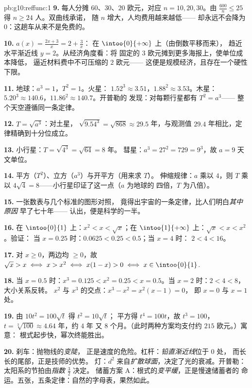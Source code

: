 \begin{solution}{pb:g10:reffunc:1}
\textbf{9.} 每人分摊 $60$、$30$、$20$ 欧元，对应 $n = 10, 20,
30$。由 $\frac{600}{n} \leq 25$ 得 $n \geq 24$ 人。双曲线承诺，
随 $n$ 增大，人均费用越来越低——
却永远不会降为 $0$：这趟车从来不是免费的。

\textbf{10.} $a(x) = \frac{2x + 3}{x} = 2 + \frac3x$：
在 $\intoo{0}{+\infty}$ 上（由倒数平移而来），
趋近水平渐近线 $y = 2$。从经济角度看：将
固定的 $3$ 欧元摊到更多海报上，使单位成本降低，
逼近材料费中不可压缩的 $2$ 欧元——
这便是规模经济，且存在一个硬性下限。

\textbf{11.} 地球：$a^3 = 1$，$T^2 = 1$。火星：
$1.52^3 \approx 3.51$，$1.88^2 \approx 3.53$。木星：
$5.20^3 \approx 140.6$，$11.86^2 \approx 140.7$。开普勒的
发现：对每颗行星都有 $T^2 = a^3$——
整个天空遵循同一条定律。

\textbf{12.} $T = \sqrt{a^3}$：对土星，
$\sqrt{9.54^3} = \sqrt{868} \approx 29.5$ 年，与观测值
$29.4$ 年相比，定律精确到十分位成立。

\textbf{13.} 小行星：$T = \sqrt{4^3} = \sqrt{64} = 8$ 年。
彗星：$a^3 = 27^2 = 729 = 9^3$，故 $a = 9$ 天文单位。

\textbf{14.} 平方（$T^2$）、立方（$a^3$）与开平方（用来求 $T$）。
伸缩规律：$a$ 乘以 $4$，则 $T$ 乘以
$4\sqrt4 = 8$——小行星印证了这一点（$a$ 为地球的
四倍，$T$ 为八倍）。

\textbf{15.} 一张数表与几个标准的图形对照，
竟得出宇宙的一条定律，比人们明白\emph{其中原因}
早了七十年——
认出，便是科学的一半。

\textbf{16.} 在 $\intoo{0}{1}$ 上：$x^2 < x < \sqrt x$；在
$\intoo{1}{+\infty}$ 上：$\sqrt x < x < x^2$。验证：
当 $x = 0.25$ 时：$0.0625 < 0.25 < 0.5$；当 $x = 4$ 时：
$2 < 4 < 16$。

\textbf{17.} 对 $x \geq 0$，两边均 $\geq 0$，故
$\sqrt x > x \iff x > x^2 \iff x(1 - x) > 0 \iff
x \in \intoo{0}{1}$.

\textbf{18.} 当 $x = 0.5$ 时：$x^3 = 0.125 < x^2 = 0.25 < x =
0.5$。当 $x = 2$ 时：$2 < 4 < 8$，大小关系反转。
$x^2$ 与 $x^3$ 的交点：$x^3 - x^2 = x^2(x - 1) = 0$，
即 $x = 0$ 与 $x = 1$ 处。

\textbf{19.} 由 $10t^2 = 100\sqrt t$ 得 $t^2 = 10\sqrt t$；
平方得 $t^4 = 100t$，故 $t^3 = 100$，
$t = \sqrt[3]{100} \approx 4.64$ 年，约 $4$ 年
又 $8$ 个月。（此时两种方案均支付约 $215$ 欧元。）寓意：
根式起步快，幂次终能胜出。

\textbf{20.} 刹车：抛物线的\emph{变陡}，
正是速度的危险。杠杆：\emph{铅直渐近线}位于 $0$ 处，
而长长的尾部，正是技师的优势。
灯：$d^2$ 来自\emph{扩散球面}，决定了光的衰减。开普勒：
太阳系的节拍由\emph{指数} $\frac32$ 决定。
储蓄方案 A：根式的\emph{变平缓}，正是慢速储蓄者的
命运。五张，五条定律：自然的字母表，果然如此。
\end{solution}

